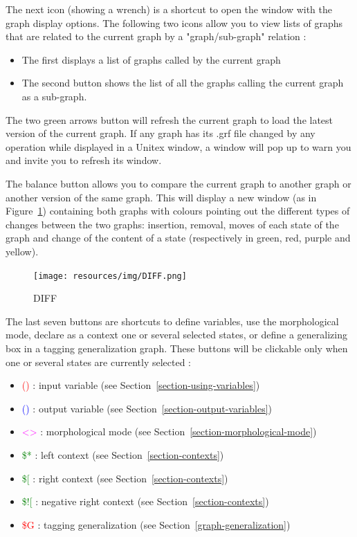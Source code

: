 \bigskip
\noindent The next icon (showing a wrench) is a shortcut to open the window with the graph display
options.
The following two icons allow you to view lists of graphs that are related to the current graph by a  "graph/sub-graph" relation :
\begin{itemize}
\item The first displays a list of graphs called by the current graph
\item The second button shows the list of all the graphs calling the current graph as a sub-graph.
\end{itemize}
The two green arrows button will refresh the current graph to load the latest version of the current graph. If any graph has its .grf file changed by any operation while displayed in a Unitex window, a window will pop up to warn you and invite you to refresh its window.

\bigskip
\noindent The balance button allows you to compare the current graph to another graph or another version of the same graph. This will display a new window (as in Figure~\ref{Graph-DIFF}) containing both graphs with colours pointing out the different types of changes between the two graphs: insertion, removal, moves of each state of the graph and change of the content of a state (respectively in green, red, purple and yellow).

\bigskip
\noindent 
\begin{figure}[!ht]
\begin{center}
\texttt{[image: resources/img/DIFF.png]}
\caption{DIFF\label{Graph-DIFF}}
\end{center}
\end{figure}
\bigskip
\noindent 

The last seven buttons are shortcuts to define variables, use the morphological mode, declare as a context one or several selected states, or define a generalizing box in a tagging generalization graph. These buttons will be clickable only when one or several states are currently selected :
\begin{itemize}
\item \textcolor{red}{()}  : input variable	(see Section~\ref{section-using-variables})
\item \textcolor{blue}{()} : output variable (see Section~\ref{section-output-variables})
\item \textcolor{magenta}{<>}  : morphological mode (see Section~\ref{section-morphological-mode})
\item \textcolor{green}{\$*} : left context (see Section~\ref{section-contexts})
\item \textcolor{green}{\$[} : right context (see Section~\ref{section-contexts})
\item \textcolor{green}{\$![} : negative right context (see Section~\ref{section-contexts})
\item \textcolor{red}{\$G}  : tagging generalization (see Section~\ref{graph-generalization})
\end{itemize}

